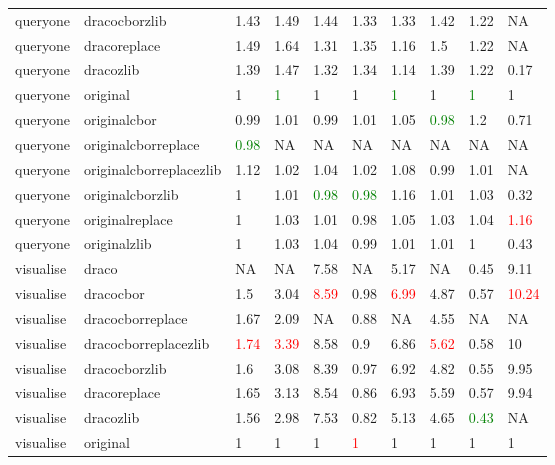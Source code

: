 \begin{landscape}
\begin{longtable}{llllllllll}
queryone & dracocborzlib & 1.43 & 1.49 & 1.44 & 1.33 & 1.33 & 1.42 & 1.22 & NA\\
queryone & dracoreplace & 1.49 & 1.64 & 1.31 & 1.35 & 1.16 & 1.5 & 1.22 & NA\\
\rowcolor{lightgray}  queryone & dracozlib & 1.39 & 1.47 & 1.32 & 1.34 & 1.14 & 1.39 & 1.22 & 0.17\\
\rowcolor{lightgray}  queryone & original & 1 & \textcolor{green}{1} & 1 & 1 & \textcolor{green}{1} & 1 & \textcolor{green}{1} & 1\\
\rowcolor{lightgray}  queryone & originalcbor & 0.99 & 1.01 & 0.99 & 1.01 & 1.05 & \textcolor{green}{0.98} & 1.2 & 0.71\\
\rowcolor{lightgray}  queryone & originalcborreplace & \textcolor{green}{0.98} & NA & NA & NA & NA & NA & NA & NA\\
\rowcolor{lightgray}  queryone & originalcborreplacezlib & 1.12 & 1.02 & 1.04 & 1.02 & 1.08 & 0.99 & 1.01 & NA\\
\rowcolor{lightgray}  queryone & originalcborzlib & 1 & 1.01 & \textcolor{green}{0.98} & \textcolor{green}{0.98} & 1.16 & 1.01 & 1.03 & 0.32\\
\rowcolor{lightgray}  queryone & originalreplace & 1 & 1.03 & 1.01 & 0.98 & 1.05 & 1.03 & 1.04 & \textcolor{red}{1.16}\\
\rowcolor{lightgray}  queryone & originalzlib & 1 & 1.03 & 1.04 & 0.99 & 1.01 & 1.01 & 1 & 0.43\\
\rowcolor{lightgray}  visualise & draco & NA & NA & 7.58 & NA & 5.17 & NA & 0.45 & 9.11\\
\rowcolor{lightgray}  visualise & dracocbor & 1.5 & 3.04 & \textcolor{red}{8.59} & 0.98 & \textcolor{red}{6.99} & 4.87 & 0.57 & \textcolor{red}{10.24}\\
\rowcolor{lightgray}  visualise & dracocborreplace & 1.67 & 2.09 & NA & 0.88 & NA & 4.55 & NA & NA\\
\rowcolor{lightgray}  visualise & dracocborreplacezlib & \textcolor{red}{1.74} & \textcolor{red}{3.39} & 8.58 & 0.9 & 6.86 & \textcolor{red}{5.62} & 0.58 & 10\\
\rowcolor{lightgray}  visualise & dracocborzlib & 1.6 & 3.08 & 8.39 & 0.97 & 6.92 & 4.82 & 0.55 & 9.95\\
visualise & dracoreplace & 1.65 & 3.13 & 8.54 & 0.86 & 6.93 & 5.59 & 0.57 & 9.94\\
visualise & dracozlib & 1.56 & 2.98 & 7.53 & 0.82 & 5.13 & 4.65 & \textcolor{green}{0.43} & NA\\
visualise & original & 1 & 1 & 1 & \textcolor{red}{1} & 1 & 1 & 1 & 1\\

\end{longtable}
\end{landscape}
